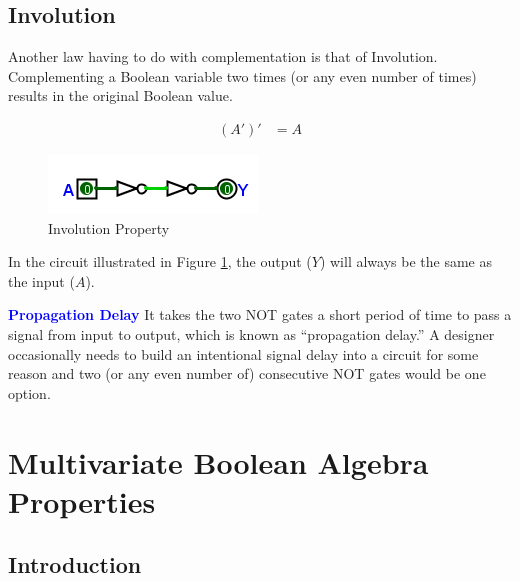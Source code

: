 \subsection{Involution}
\label{BF:subsec:involution}


Another law having to do with complementation is that of Involution. Complementing a Boolean variable two times (or any even number of times) results in the original Boolean value. 

\begin{align}
  \label{BF:eq:involuton}
  (A')' &= A
\end{align}

\begin{figure}[H]
	\centering
	\includegraphics[width=\maxwidth{.95\linewidth}]{gfx/04_18}
	\caption{Involution Property}
	\label{fig:04_18}
\end{figure}

In the circuit illustrated in Figure \ref{fig:04_18}, the output ($ Y $) will always be the same as the input ($ A $). 

\begin{tcolorbox}[colback=blue!5!white,colframe=blue!75!black]
  \textcolor{blue}{\textbf{Propagation Delay}}
  \tcblower
  It takes the two \textsf{NOT} gates a short period of time to pass a signal from input to output, which is known as ``propagation delay.'' A designer occasionally needs to build an intentional signal delay into a circuit for some reason and two (or any even number of) consecutive \textsf{NOT} gates would be one option.
\end{tcolorbox}

\section{Multivariate Boolean Algebra Properties}
\label{BF:sec:multivariate_boolean_algebra_properties}
\subsection{Introduction}
\label{BF:subsec:introduction_to_multivariate}

